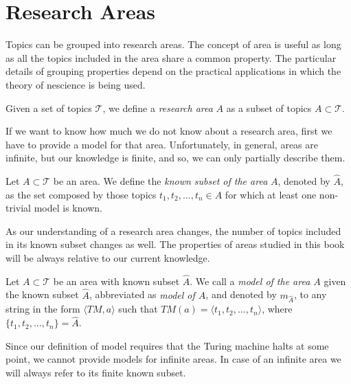 %
%

\section{Research Areas}
\label{sec:areas}

Topics can be grouped into research areas. The concept of area is useful as long as all the topics included in the area share a common property. The particular details of grouping properties depend on the practical applications in which the theory of nescience is being used.

\begin{definition}
Given a set of topics $\mathcal{T}$, we define a \emph{research area} $A$ as a subset of topics $A \subset \mathcal{T}$.
\end{definition}

If we want to know how much we do not know about a research area, first we have to provide a model for that area. Unfortunately, in general, areas are infinite, but our knowledge is finite, and so, we can only partially describe them.

\begin{definition}
Let $A \subset \mathcal{T}$ be an area. We define the \emph{known subset of the area} $A$, denoted by $\hat{A}$, as the set composed by those topics $t_1, t_2, \ldots, t_n \in A$ for which at least one non-trivial model is known.
\end{definition}

As our understanding of a research area changes, the number of topics included in its known subset changes as well. The properties of areas studied in this book will be always relative to our current knowledge.

\begin{definition}
Let $A \subset \mathcal{T}$ be an area with known subset $\hat{A}$. We call a \emph{model of the area $A$} given the known subset $\hat{A}$, abbreviated as \emph{model of $A$}, and denoted by $m_{\hat{A}}$, to any string in the form $\langle TM, a\rangle$ such that $TM(a) = \langle t_1, t_2, \ldots, t_n\rangle$, where $\{t_1, t_2, \ldots, t_n\} = \hat{A}$.
\end{definition}

Since our definition of model requires that the Turing machine halts at some point, we cannot provide models for infinite areas. In case of an infinite area we will always refer to its finite known subset.

